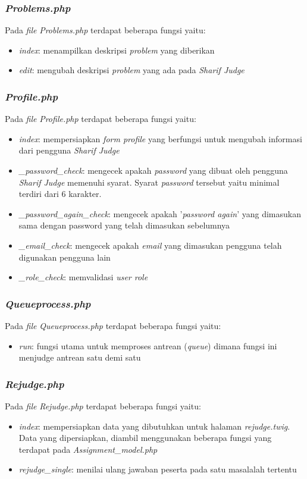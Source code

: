 \subsubsection{\textit{Problems.php}}
Pada \textit{file} \textit{Problems.php} terdapat beberapa fungsi yaitu:
\begin{itemize}
	\item \textit{index}: menampilkan deskripsi \textit{problem} yang diberikan
	\item \textit{edit}: mengubah deskripsi \textit{problem} yang ada pada \textit{Sharif Judge}
\end{itemize}

\subsubsection{\textit{Profile.php}}
Pada \textit{file} \textit{Profile.php} terdapat beberapa fungsi yaitu:
\begin{itemize}
	\item \textit{index}: mempersiapkan \textit{form profile} yang berfungsi untuk mengubah informasi dari pengguna \textit{Sharif Judge}
	\item \textit{\_password\_check}: mengecek apakah \textit{password} yang dibuat oleh pengguna \textit{Sharif Judge} memenuhi syarat. Syarat \textit{password} tersebut yaitu minimal terdiri dari 6 karakter.
	\item \textit{\_password\_again\_check}: mengecek apakah '\textit{password again}' yang dimasukan sama dengan password yang telah dimasukan sebelumnya
	\item \textit{\_email\_check}: mengecek apakah \textit{email} yang dimasukan pengguna telah digunakan pengguna lain
	\item \textit{\_role\_check}: memvalidasi \textit{user role}
\end{itemize}

\subsubsection{\textit{Queueprocess.php}}
Pada \textit{file} \textit{Queueprocess.php} terdapat beberapa fungsi yaitu:
\begin{itemize}
	\item \textit{run}: fungsi utama untuk memproses antrean (\textit{queue}) dimana fungsi ini menjudge antrean satu demi satu
\end{itemize}

\subsubsection{\textit{Rejudge.php}}
Pada \textit{file} \textit{Rejudge.php} terdapat beberapa fungsi yaitu:
\begin{itemize}
	\item \textit{index}: mempersiapkan data yang dibutuhkan untuk halaman \textit{rejudge.twig}. Data yang dipersiapkan, diambil menggunakan beberapa fungsi yang terdapat pada \textit{Assignment\_model.php}
	\item \textit{rejudge\_single}: menilai ulang jawaban peserta pada satu masalalah tertentu
\end{itemize}

